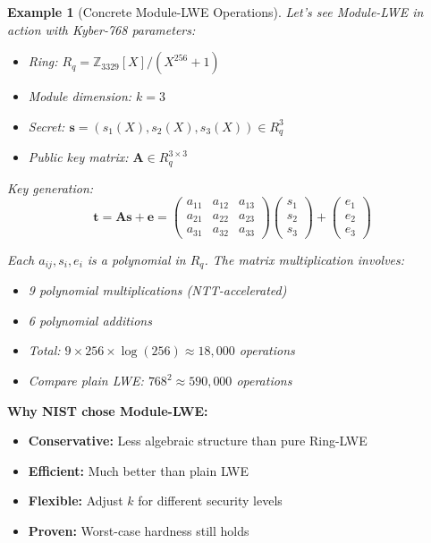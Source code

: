 \documentclass[11pt,a4paper]{article}
\newtheorem{example}{Example}
\begin{document}
\begin{example}[Concrete Module-LWE Operations]
Let's see Module-LWE in action with Kyber-768 parameters:
\begin{itemize}
    \item Ring: $R_q = \mathbb{Z}_{3329}[X]/(X^{256} + 1)$
    \item Module dimension: $k = 3$
    \item Secret: $\mathbf{s} = (s_1(X), s_2(X), s_3(X)) \in R_q^3$
    \item Public key matrix: $\mathbf{A} \in R_q^{3 \times 3}$
\end{itemize}

Key generation:
$$\mathbf{t} = \mathbf{A} \mathbf{s} + \mathbf{e} = \begin{pmatrix}
a_{11} & a_{12} & a_{13} \\
a_{21} & a_{22} & a_{23} \\
a_{31} & a_{32} & a_{33}
\end{pmatrix} \begin{pmatrix}
s_1 \\ s_2 \\ s_3
\end{pmatrix} + \begin{pmatrix}
e_1 \\ e_2 \\ e_3
\end{pmatrix}$$

Each $a_{ij}, s_i, e_i$ is a polynomial in $R_q$. The matrix multiplication involves:
\begin{itemize}
    \item 9 polynomial multiplications (NTT-accelerated)
    \item 6 polynomial additions
    \item Total: $9 \times 256 \times \log(256) \approx 18,000$ operations
    \item Compare plain LWE: $768^2 \approx 590,000$ operations
\end{itemize}
\end{example}

\textbf{Why NIST chose Module-LWE:}
\begin{itemize}
    \item \textbf{Conservative:} Less algebraic structure than pure Ring-LWE
    \item \textbf{Efficient:} Much better than plain LWE
    \item \textbf{Flexible:} Adjust $k$ for different security levels
    \item \textbf{Proven:} Worst-case hardness still holds
\end{itemize}
\end{document}
